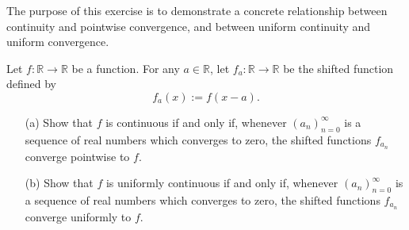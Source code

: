 \begin{problem}[15pts]
    The purpose of this exercise is to demonstrate a concrete relationship between continuity and pointwise convergence, and between uniform continuity and uniform convergence. 

Let $f:\mathbb{R} \to \mathbb{R}$ be a function. For any $a \in \mathbb{R}$, let $f_a : \mathbb{R} \to \mathbb{R}$ be the shifted function defined by
\[
f_a(x) := f(x - a).
\]

\begin{enumerate}
  \item[(a)] Show that $f$ is continuous if and only if, whenever $(a_n)_{n=0}^\infty$ is a sequence of real numbers which converges to zero, the shifted functions $f_{a_n}$ converge pointwise to $f$.

  \item[(b)] Show that $f$ is uniformly continuous if and only if, whenever $(a_n)_{n=0}^\infty$ is a sequence of real numbers which converges to zero, the shifted functions $f_{a_n}$ converge uniformly to $f$.
\end{enumerate}

\end{problem}
